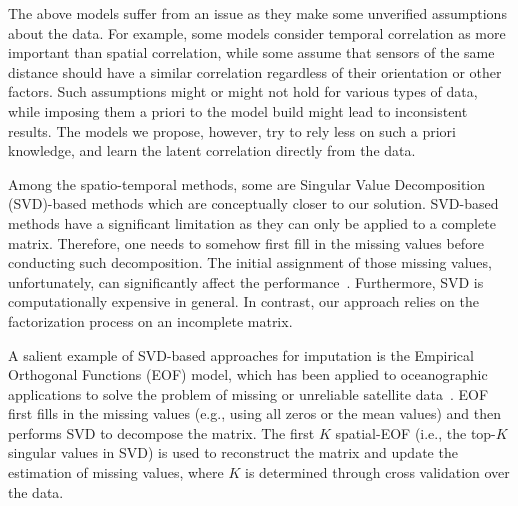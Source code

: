 The above models suffer from an issue as they make some unverified assumptions about the data. For example, some models consider temporal correlation as more important than spatial correlation,
while some assume that sensors of the same distance should have a similar correlation regardless of their 
orientation or other factors.  Such assumptions might or might not hold for various types of data, while imposing them a priori
to the model build might lead to inconsistent results.  The models we propose, however, try to rely less on such a priori 
knowledge, and learn the latent correlation directly from the data.  

Among the spatio-temporal methods, some are Singular Value Decomposition (SVD)-based methods which are conceptually closer to our solution. 
SVD-based methods have a significant limitation as they can only be applied to a complete matrix.
Therefore, one needs to somehow first fill in the missing values before conducting such decomposition.
The initial assignment of those missing values, unfortunately, can significantly affect the performance~\cite{koren2009matrix}.
Furthermore, SVD is computationally expensive in general.
In contrast, our approach relies on the factorization process on an incomplete matrix.


A salient example of SVD-based approaches for imputation is the Empirical Orthogonal Functions
(EOF) model, which has been applied to oceanographic applications to
solve the problem of missing or unreliable satellite
data~\cite{beckers2003eof}.  EOF first fills in the missing values
(e.g., using all zeros or the mean values) and then performs SVD 
to decompose the matrix. The first $K$ spatial-EOF (i.e., the top-$K$
singular values in SVD) is used to reconstruct the matrix and update the estimation of missing values, 
where $K$ is determined through cross validation over the data.

